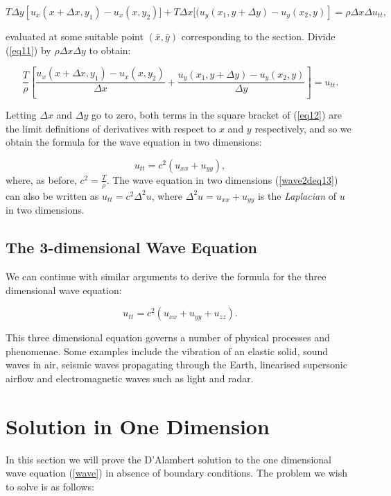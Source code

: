 \documentclass[a4paper, 12pt]{article}
\numberwithin{equation}{section}
\begin{document}
\begin{equation} \label{eq11}
    T\Delta y\left[u_x(x+\Delta x, y_1)-u_x(x, y_2)]+T\Delta x[(u_y(x_1, y+\Delta y)-u_y(x_2,y)\right]=\rho\Delta x\Delta u_{tt},
\end{equation}

evaluated at some suitable point $(\bar{x},\bar{y})$ corresponding to the section. Divide (\ref{eq11}) by $\rho\Delta x\Delta y$ to obtain:

\begin{equation} \label{eq12}
    \frac{T}{\rho}\left[\frac{u_x(x+\Delta x, y_1)-u_x(x,y_2)}{\Delta x}+\frac{u_y(x_1,y+ \Delta y)-u_y(x_2,y)}{\Delta y}\right]=u_{tt}.
\end{equation}

Letting $\Delta x$ and $\Delta y$ go to zero, both terms in the square bracket of (\ref{eq12}) are the limit definitions of derivatives with
respect to $x$ and $y$ respectively, and so we obtain the formula for the wave equation in two dimensions:

\begin{equation} \label{wave2deq13}
    u_{tt}=c^2(u_{xx}+u_{yy}),
\end{equation}
where, as before, $c^2=\frac{T}{\rho}$. The wave equation in two dimensions (\ref{wave2deq13}) can also be written as $u_{tt}=c^2\Delta^2 u$, 
where $\Delta^2 u=u_{xx}+u_{yy}$ is the \emph{Laplacian} of $u$ in two dimensions.

\subsection{The 3-dimensional Wave Equation}
We can continue with similar arguments to derive the formula for the three dimensional wave equation:

\begin {equation} \label{wave3deq14}
    u_{tt}=c^2(u_{xx}+u_{yy}+u_{zz}).
\end{equation}

This three dimensional equation governs a number of physical processes and phenomenae. Some examples include the vibration of an elastic solid, 
sound waves in air, seismic waves propagating through the Earth, linearised supersonic airflow and electromagnetic waves such as light and radar.
\cite{Str}

\section{Solution in One Dimension}
In this section we will prove the D'Alambert solution to the one dimensional wave equation (\ref{wave}) 
in absence of boundary conditions. The problem we wish to solve is as follows:
\end{document}

